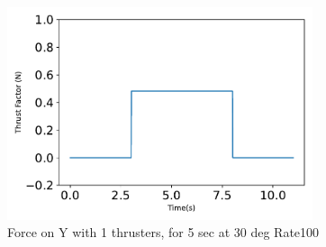 \begin{figure}[htbp]\centerline{\includegraphics[width=0.8\textwidth]{AutoTeX/Force_1Thrusters_5s_30deg_Loc2_Rate100}}\caption{Force on Y with 1 thrusters, for 5 sec at 30 deg Rate100}\label{fig:Force_1Thrusters_5s_30deg_Loc2_Rate100}\end{figure}